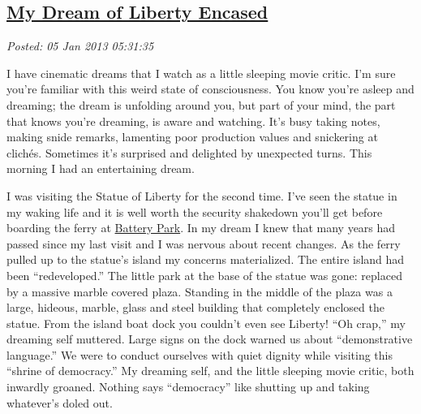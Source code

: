 %

\subsection*{\href{http://bakerjd99.wordpress.com/2013/01/04/my-dream-of-liberty-encased/}{My Dream of Liberty Encased}}


\noindent\emph{Posted: 05 Jan 2013 05:31:35}
\vspace{6pt}

I have cinematic dreams that I watch as a little sleeping movie critic.
I'm sure you're familiar with this weird state of consciousness. You
know you're asleep and dreaming; the dream is unfolding around you, but
part of your mind, the part that knows you're dreaming, is aware and
watching. It's busy taking notes, making snide remarks, lamenting poor
production values and snickering at clichés. Sometimes it's surprised
and delighted by unexpected turns. This morning I had an entertaining
dream.

 
I was visiting the Statue of Liberty for the second time. I've seen the
statue in my waking life and it is well worth the security shakedown
you'll get before boarding the ferry at
\href{http://www.statuecruises.com/pd\_directions.html}{Battery Park}.
In my dream I knew that many years had passed since my last visit and I
was nervous about recent changes. As the ferry pulled up to the statue's
island my concerns materialized. The entire island had been
``redeveloped.'' The little park at the base of the statue was gone:
replaced by a massive marble covered plaza. Standing in the middle of
the plaza was a large, hideous, marble, glass and steel building that
completely enclosed the statue. From the island boat dock
you couldn't even see Liberty! ``Oh crap,'' my dreaming self muttered.
Large signs on the dock warned us about ``demonstrative language.'' We
were to conduct ourselves with quiet dignity while visiting this
``shrine of democracy.'' My dreaming self, and the little sleeping movie
critic, both inwardly groaned. Nothing says ``democracy'' like shutting
up and taking whatever's doled out.

